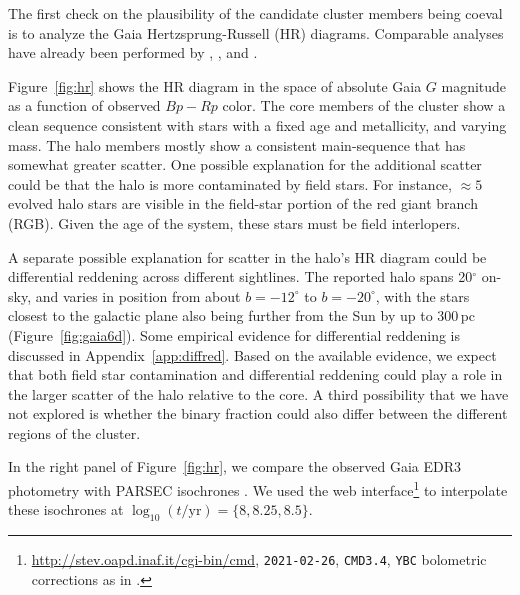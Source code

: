 \documentclass[12pt,twocolumn,tighten]{aastex63}
\begin{document}
The first check on the plausibility of the candidate cluster members
being coeval is to analyze the Gaia Hertzsprung-Russell (HR) diagrams.  Comparable analyses
have already been performed by ,
, and .

Figure~\ref{fig:hr} shows the HR diagram in the space of absolute Gaia
$G$ magnitude as a function of observed $Bp-Rp$ color.  The core
members of the cluster show a clean sequence consistent with stars
with a fixed age and metallicity, and varying mass.  The halo members
mostly show a consistent main-sequence that has somewhat greater
scatter.  One possible explanation for the additional scatter could be
that the halo is more contaminated by field stars.  For instance,
$\approx5$ evolved halo stars are visible in the field-star portion of
the red giant branch (RGB).  Given the age of the system, these stars
must be field interlopers.

A separate possible explanation for scatter in the halo's HR diagram
could be differential reddening across different sightlines.  The
reported halo spans 20$^\circ$ on-sky, and varies in position from
about $b=-12^\circ$ to $b=-20^\circ$, with the stars closest to the
galactic plane also being further from the Sun by up to 300\,pc
(Figure~\ref{fig:gaia6d}).  Some empirical evidence for differential
reddening is discussed in Appendix~\ref{app:diffred}. Based on the
available evidence, we expect that both field star contamination and
differential reddening could play a role in the larger scatter of the
halo relative to the core.  A third possibility that we have not
explored is whether the binary fraction could also differ between the
different regions of the cluster.

In the right panel of Figure~\ref{fig:hr}, we compare the observed
Gaia EDR3 photometry with PARSEC isochrones
\citep{bressan_parsec_2012,chen_improving_2014,chen_parsec_2015,marigo_new_2017}.
We used the web
interface\footnote{\url{http://stev.oapd.inaf.it/cgi-bin/cmd},
\texttt{2021-02-26}, \texttt{CMD3.4}, \texttt{YBC} bolometric
corrections as in \citet{chen_2019_YBC}.} to interpolate these
isochrones at $\log_{10}(t/\mathrm{yr})=\{8, 8.25, 8.5\}$.
\end{document}
